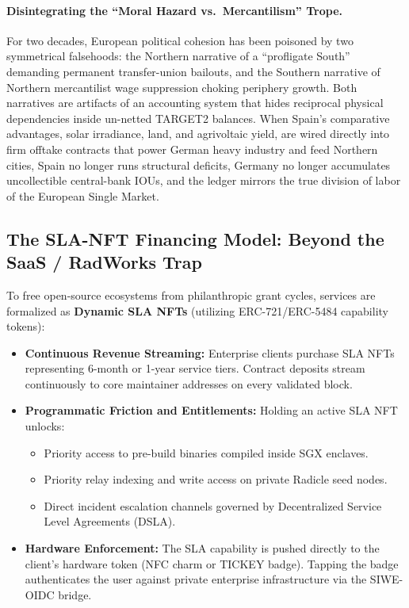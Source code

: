\documentclass[a4paper,11pt,twoside,parskip=half-,headings=small]{scrartcl}
\begin{document}
\paragraph{Disintegrating the ``Moral Hazard vs.\ Mercantilism'' Trope.}
For two decades, European political cohesion has been poisoned by two symmetrical falsehoods: the Northern narrative of a ``profligate South'' demanding permanent transfer-union bailouts, and the Southern narrative of Northern mercantilist wage suppression choking periphery growth. Both narratives are artifacts of an accounting system that hides reciprocal physical dependencies inside un-netted TARGET2 balances. When Spain's comparative advantages, solar irradiance, land, and agrivoltaic yield, are wired directly into firm offtake contracts that power German heavy industry and feed Northern cities, Spain no longer runs structural deficits, Germany no longer accumulates uncollectible central-bank IOUs, and the ledger mirrors the true division of labor of the European Single Market.


\subsection{The SLA-NFT Financing Model: Beyond the SaaS / RadWorks Trap}
\label{sec:sla_nft}

To free open-source ecosystems from philanthropic grant cycles, services are formalized
as \textbf{Dynamic SLA NFTs} (utilizing ERC-721/ERC-5484 capability tokens):
\begin{itemize}
  \item \textbf{Continuous Revenue Streaming:} Enterprise clients purchase SLA NFTs
representing 6-month or 1-year service tiers. Contract deposits stream continuously
to core maintainer addresses on every validated block.
  \item \textbf{Programmatic Friction and Entitlements:} Holding an active SLA NFT unlocks:
\begin{itemize}
\item Priority access to pre-build binaries compiled inside SGX enclaves.
\item Priority relay indexing and write access on private Radicle seed nodes.
\item Direct incident escalation channels governed by Decentralized Service Level
Agreements (DSLA).
\end{itemize}
  \item \textbf{Hardware Enforcement:} The SLA capability is pushed directly to the client's
hardware token (NFC charm or TICKEY badge). Tapping the badge authenticates the user
against private enterprise infrastructure via the SIWE-OIDC bridge.
\end{itemize}
\end{document}
